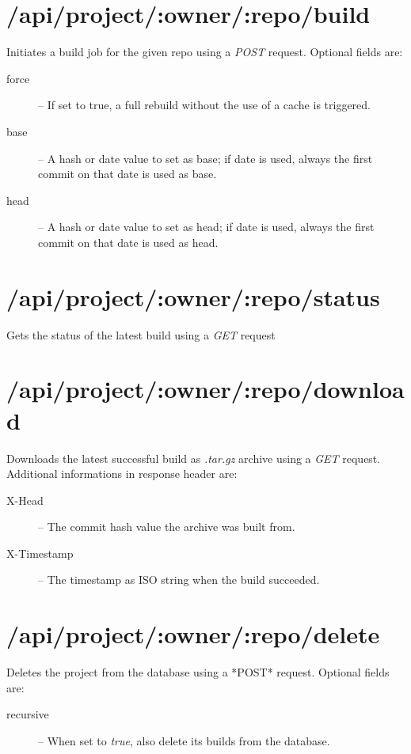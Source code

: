 \documentclass[a4paper,english,11pt]{report}
\begin{document}
\section{/api/project/:owner/:repo/build}
Initiates a build job for the given repo using a \emph{POST} request. Optional fields are:
\begin{description}
  \item[force] -- If set to true, a full rebuild without the use of a cache is triggered.
  \item[base] -- A hash or date value to set as base; if date is used, always the first commit on that date is used as base.
  \item[head] -- A hash or date value to set as head; if date is used, always the first commit on that date is used as head.
\end{description}

\section{/api/project/:owner/:repo/status}
Gets the status of the latest build using a \emph{GET} request

\section{/api/project/:owner/:repo/download}
Downloads the latest successful build as \emph{.tar.gz} archive using a \emph{GET} request. Additional informations in response header are:
\begin{description}
  \item[X-Head] -- The commit hash value the archive was built from.
  \item[X-Timestamp] -- The timestamp as ISO string when the build succeeded.
\end{description}

\section{/api/project/:owner/:repo/delete}
Deletes the project from the database using a *POST* request. Optional fields are:
\begin{description}
  \item[recursive] -- When set to \emph{true}, also delete its builds from the database.
\end{description}
\end{document}
